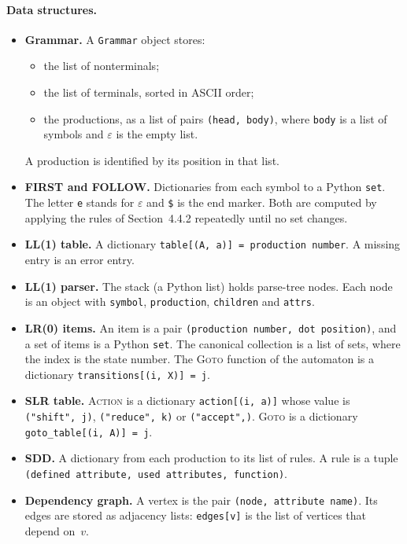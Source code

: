 \documentclass[11pt,a4paper]{article}
\newcommand{\Goto}{\textsc{Goto}}
\newcommand{\Action}{\textsc{Action}}
\newcommand{\code}[1]{\texttt{#1}}
\begin{document}
\paragraph{Data structures.}
\begin{itemize}
  \item \textbf{Grammar.} A \code{Grammar} object stores:
  \begin{itemize}
    \item the list of nonterminals;
    \item the list of terminals, sorted in ASCII order;
    \item the productions, as a list of pairs \code{(head, body)}, where \code{body} is a list of symbols and $\varepsilon$ is the empty list.
  \end{itemize}
  A production is identified by its position in that list.
  \item \textbf{FIRST and FOLLOW.} Dictionaries from each symbol to a Python \code{set}. The letter \code{e} stands for $\varepsilon$ and \code{\$} is the end marker. Both are computed by applying the rules of Section~4.4.2 repeatedly until no set changes.
  \item \textbf{LL(1) table.} A dictionary \code{table[(A, a)] = production number}. A missing entry is an error entry.
  \item \textbf{LL(1) parser.} The stack (a Python list) holds parse-tree nodes. Each node is an object with \code{symbol}, \code{production}, \code{children} and \code{attrs}.
  \item \textbf{LR(0) items.} An item is a pair \code{(production number, dot position)}, and a set of items is a Python \code{set}. The canonical collection is a list of sets, where the index is the state number. The \Goto{} function of the automaton is a dictionary \code{transitions[(i, X)] = j}.
  \item \textbf{SLR table.} \Action{} is a dictionary \code{action[(i, a)]} whose value is \code{("shift", j)}, \code{("reduce", k)} or \code{("accept",)}. \Goto{} is a dictionary \code{goto\_table[(i, A)] = j}.
  \item \textbf{SDD.} A dictionary from each production to its list of rules. A rule is a tuple \code{(defined attribute, used attributes, function)}.
  \item \textbf{Dependency graph.} A vertex is the pair \code{(node, attribute name)}. Its edges are stored as adjacency lists: \code{edges[v]} is the list of vertices that depend on~$v$.
\end{itemize}
\end{document}

